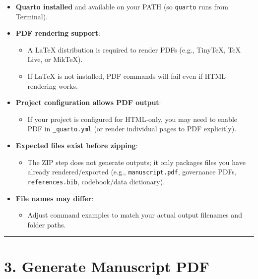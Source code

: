 \documentclass[
]{report}
\providecommand{\tightlist}{%
  \setlength{\itemsep}{0pt}\setlength{\parskip}{0pt}}
\begin{document}
\begin{itemize}
\tightlist
\item
  \textbf{Quarto installed} and available on your PATH (so
  \texttt{quarto} runs from Terminal).
\item
  \textbf{PDF rendering support}:

  \begin{itemize}
  \tightlist
  \item
    A LaTeX distribution is required to render PDFs (e.g., TinyTeX, TeX
    Live, or MikTeX).
  \item
    If LaTeX is not installed, PDF commands will fail even if HTML
    rendering works.
  \end{itemize}
\item
  \textbf{Project configuration allows PDF output}:

  \begin{itemize}
  \tightlist
  \item
    If your project is configured for HTML-only, you may need to enable
    PDF in \texttt{\_quarto.yml} (or render individual pages to PDF
    explicitly).
  \end{itemize}
\item
  \textbf{Expected files exist before zipping}:

  \begin{itemize}
  \tightlist
  \item
    The ZIP step does not generate outputs; it only packages files you
    have already rendered/exported (e.g., \texttt{manuscript.pdf},
    governance PDFs, \texttt{references.bib}, codebook/data dictionary).
  \end{itemize}
\item
  \textbf{File names may differ}:

  \begin{itemize}
  \tightlist
  \item
    Adjust command examples to match your actual output filenames and
    folder paths.
  \end{itemize}
\end{itemize}

\begin{center}\rule{0.5\linewidth}{0.5pt}\end{center}

\chapter{3. Generate Manuscript PDF}\label{generate-manuscript-pdf}
\end{document}
